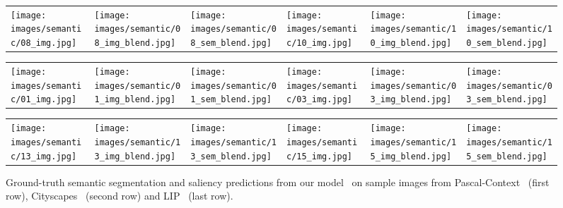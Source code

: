 \begin{figure}[t]
\centering
\setlength\tabcolsep{0.1pt}
\begin{center}

    \begin{tabular}{m{2.25cm}m{2.25cm}m{2.25cm}m{2.25cm}m{2.25cm}m{2.25cm}}
        \texttt{[image: images/semantic/08\_img.jpg]}&
        \texttt{[image: images/semantic/08\_img\_blend.jpg]}&
        \texttt{[image: images/semantic/08\_sem\_blend.jpg]}&
        \texttt{[image: images/semantic/10\_img.jpg]}&
        \texttt{[image: images/semantic/10\_img\_blend.jpg]}&
        \texttt{[image: images/semantic/10\_sem\_blend.jpg]}
    \end{tabular}

    \begin{tabular}{m{2.25cm}m{2.25cm}m{2.25cm}m{2.25cm}m{2.25cm}m{2.25cm}}
        \texttt{[image: images/semantic/01\_img.jpg]}&
        \texttt{[image: images/semantic/01\_img\_blend.jpg]}&
        \texttt{[image: images/semantic/01\_sem\_blend.jpg]}&
        \texttt{[image: images/semantic/03\_img.jpg]}&
        \texttt{[image: images/semantic/03\_img\_blend.jpg]}&
        \texttt{[image: images/semantic/03\_sem\_blend.jpg]}
    \end{tabular}

    \begin{tabular}{m{2.25cm}m{2.25cm}m{2.25cm}m{2.25cm}m{2.25cm}m{2.25cm}}
        \texttt{[image: images/semantic/13\_img.jpg]}&
        \texttt{[image: images/semantic/13\_img\_blend.jpg]}&
        \texttt{[image: images/semantic/13\_sem\_blend.jpg]}&
        \texttt{[image: images/semantic/15\_img.jpg]}&
        \texttt{[image: images/semantic/15\_img\_blend.jpg]}&
        \texttt{[image: images/semantic/15\_sem\_blend.jpg]}
    \end{tabular}

\end{center}
\caption{Ground-truth semantic segmentation and saliency predictions from our model~\cite{cornia2017sam} on sample images from Pascal-Context~\cite{mottaghi_cvpr14} (first row), Cityscapes~\cite{Cordts2016Cityscapes} (second row) and LIP~\cite{gong2017look} (last row).}
\label{fig:imgs-semantic}
\end{figure}




